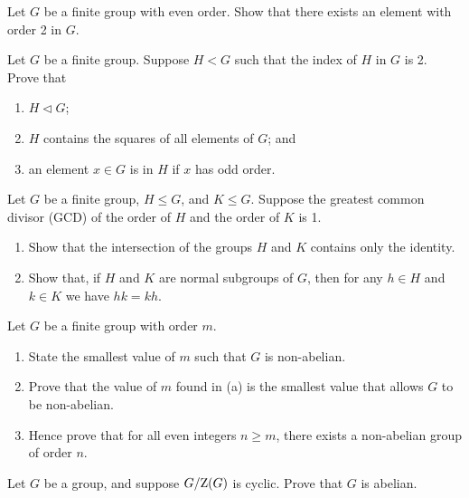 \begin{problem}
    Let $G$ be a finite group with even order. Show that there exists an element with order 2 in $G$.
\end{problem}

\begin{problem}\label{problem-subgroup-of-index-2}
    Let $G$ be a finite group. Suppose $H < G$ such that the index of $H$ in $G$ is 2. Prove that
    \begin{enumerate}[label=(\roman*)]
        \item $H \lhd G$;
        \item $H$ contains the squares of all elements of $G$; and
        \item an element $x \in G$ is in $H$ if $x$ has odd order.
    \end{enumerate}
\end{problem}

\newpage

\begin{problem}\label{problem-intersection-of-coprime-subgroups}
    Let $G$ be a finite group, $H \leq G$, and $K \leq G$. Suppose the greatest common divisor (GCD) of the order of $H$ and the order of $K$ is 1.
    \begin{enumerate}[label=(\alph*)]
        \item Show that the intersection of the groups $H$ and $K$ contains only the identity.
        \item Show that, if $H$ and $K$ are normal subgroups of $G$, then for any $h \in H$ and $k \in K$ we have $hk = kh$.
    \end{enumerate}
\end{problem}

\begin{problem}\label{problem-smallest-nonabelian-group}
    Let $G$ be a finite group with order $m$.
    \begin{enumerate}[label=(\alph*)]
        \item State the smallest value of $m$ such that $G$ is non-abelian.
        \item Prove that the value of $m$ found in (a) is the smallest value that allows $G$ to be non-abelian.
        \item Hence prove that for all even integers $n \geq m$, there exists a non-abelian group of order $n$.
    \end{enumerate}
\end{problem}

\begin{problem}\label{problem-quotient-of-group-mod-center-is-cyclic-implies-abelian}
    Let $G$ be a group, and suppose $G / \mathrm{Z}(G)$ is cyclic. Prove that $G$ is abelian.
\end{problem}

